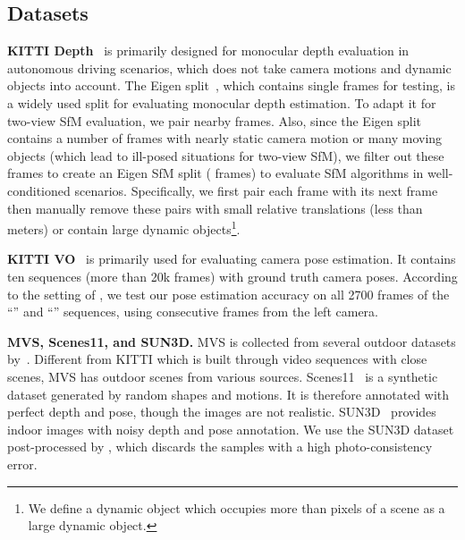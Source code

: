 \documentclass[final]{cvpr}
\begin{document}
\subsection{Datasets}

\textbf{KITTI Depth}~\cite{kittidataset} is primarily designed for monocular depth evaluation in autonomous driving scenarios, which does not take camera motions and dynamic objects into account. The Eigen split~\cite{eigen2014depth}, which contains  single frames for testing, is a widely used split for evaluating monocular depth estimation. To adapt it for two-view SfM evaluation, we pair nearby frames. Also, since the Eigen split contains a number of frames with nearly static camera motion or many moving objects (which lead to ill-posed situations for two-view SfM), we filter out these frames to create an Eigen SfM split ( frames) to evaluate SfM algorithms in  well-conditioned scenarios. Specifically, we first pair each frame with its next frame then manually remove these pairs with small relative translations (less than  meters) or contain large dynamic objects\footnote{We define a dynamic object which occupies more than  pixels of a scene as a large dynamic object.}.



\textbf{KITTI VO}~\cite{kittidataset} is primarily used for evaluating camera pose estimation. It contains ten sequences (more than 20k frames) with ground truth camera poses. According to the setting of \cite{sfmlearner}, we test our pose estimation accuracy on all 2700 frames of the ``'' and ``'' sequences, using consecutive frames from the left camera.

\textbf{MVS, Scenes11, and SUN3D.} MVS is collected from several outdoor datasets by~\cite{ummenhofer2017demon}. Different from KITTI which is built through video sequences with close scenes, MVS has outdoor scenes from various sources.
{Scenes11}~\cite{ummenhofer2017demon} is a synthetic dataset generated by random shapes and motions. It is therefore annotated with perfect depth and pose, though the images are not realistic.
{SUN3D}~\cite{xiao2013sun3d} provides indoor images with noisy depth and pose annotation. We use the SUN3D dataset post-processed by \cite{ummenhofer2017demon}, which discards the samples with a high photo-consistency error.
\end{document}
